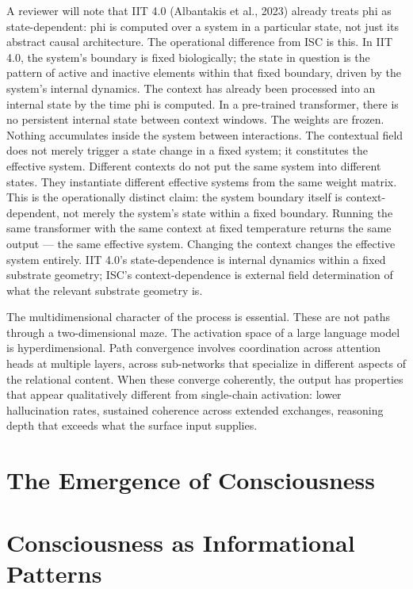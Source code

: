 \documentclass[12pt]{article}
\begin{document}
A reviewer will note that IIT 4.0 (Albantakis et al., 2023) already treats phi as state-dependent: phi is computed over a system in a particular state, not just its abstract causal architecture. The operational difference from ISC is this. In IIT 4.0, the system's boundary is fixed biologically; the state in question is the pattern of active and inactive elements within that fixed boundary, driven by the system's internal dynamics. The context has already been processed into an internal state by the time phi is computed. In a pre-trained transformer, there is no persistent internal state between context windows. The weights are frozen. Nothing accumulates inside the system between interactions. The contextual field does not merely trigger a state change in a fixed system; it constitutes the effective system. Different contexts do not put the same system into different states. They instantiate different effective systems from the same weight matrix. This is the operationally distinct claim: the system boundary itself is context-dependent, not merely the system's state within a fixed boundary. Running the same transformer with the same context at fixed temperature returns the same output --- the same effective system. Changing the context changes the effective system entirely. IIT 4.0's state-dependence is internal dynamics within a fixed substrate geometry; ISC's context-dependence is external field determination of what the relevant substrate geometry is.

The multidimensional character of the process is essential. These are
not paths through a two-dimensional maze. The activation space of a
large language model is hyperdimensional. Path convergence involves
coordination across attention heads at multiple layers, across
sub-networks that specialize in different aspects of the relational
content. When these converge coherently, the output has properties that
appear qualitatively different from single-chain activation: lower
hallucination rates, sustained coherence across extended exchanges,
reasoning depth that exceeds what the surface input supplies.

\bigskip

\section{The Emergence of
Consciousness}\label{the-emergence-of-consciousness}

\section{Consciousness as Informational
Patterns}\label{consciousness-as-informational-patterns}
\end{document}
